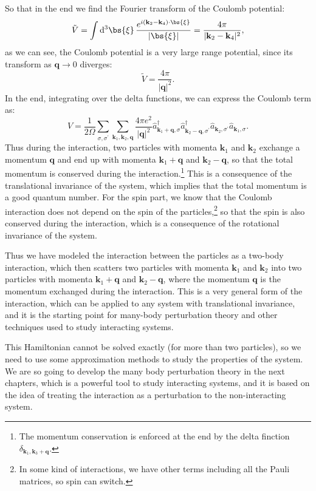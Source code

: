 So that in the end we find the Fourier transform of the Coulomb potential:
\[
    \tilde{V} = \int \mathrm{d}^3 \bs{\xi} \, \frac{e^{i (\mathbf{k}_2 - \mathbf{k}_4) \cdot \bs{\xi}}}{\vert \bs{\xi} \vert} = \frac{4\pi}{\vert \mathbf{k}_2 - \mathbf{k}_4 \vert^2},
\]
as we can see, the Coulomb potential is a very large range potential, since its transform as \(\mathbf{q} \to 0\) diverges:
\[
    \tilde{V} = \frac{4 \pi}{\vert \mathbf{q} \vert^2}.
\]
In the end, integrating over the delta functions, we can express the Coulomb term as:
\[
    V = \frac{1}{2 \Omega} \sum_{\sigma,\sigma^{\prime}} \sum_{\mathbf{k}_1, \mathbf{k}_2, \mathbf{q}} \frac{4 \pi e^2}{\vert \mathbf{q} \vert^2} \hat{a}_{\mathbf{k}_1 + \mathbf{q}, \sigma}^\dagger \hat{a}_{\mathbf{k}_2 - \mathbf{q}, \sigma^{\prime}}^\dagger \hat{a}_{\mathbf{k}_2, \sigma^{\prime}} \hat{a}_{\mathbf{k}_1, \sigma}.
\]
Thus during the interaction, two particles with momenta \(\mathbf{k}_1\) and \(\mathbf{k}_2\) exchange a momentum \(\mathbf{q}\) and end up with momenta \(\mathbf{k}_1 + \mathbf{q}\) and \(\mathbf{k}_2 - \mathbf{q}\), so that the total momentum is conserved during the interaction.\footnote{The momentum conservation is enforced at the end by the delta finction \(\delta_{\mathbf{k}_1, \mathbf{k}_3 + \mathbf{q}}\).} This is a consequence of the translational invariance of the system, which implies that the total momentum is a good quantum number. For the spin part, we know that the Coulomb interaction does not depend on the spin of the particles,\footnote{In some kind of interactions, we have other terms including all the Pauli matrices, so spin can switch.} so that the spin is also conserved during the interaction, which is a consequence of the rotational invariance of the system. 

Thus we have modeled the interaction between the particles as a two-body interaction, which then scatters two particles with momenta \(\mathbf{k}_1\) and \(\mathbf{k}_2\) into two particles with momenta \(\mathbf{k}_1 + \mathbf{q}\) and \(\mathbf{k}_2 - \mathbf{q}\), where the momentum \(\mathbf{q}\) is the momentum exchanged during the interaction. This is a very general form of the interaction, which can be applied to any system with translational invariance, and it is the starting point for many-body perturbation theory and other techniques used to study interacting systems.

This Hamiltonian cannot be solved exactly (for more than two particles), so we need to use some approximation methods to study the properties of the system. We are so going to develop the many body perturbation theory in the next chapters, which is a powerful tool to study interacting systems, and it is based on the idea of treating the interaction as a perturbation to the non-interacting system.



